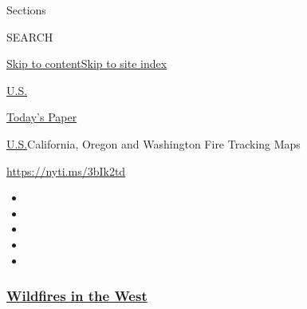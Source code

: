 Sections

SEARCH

\protect\hyperlink{site-content}{Skip to
content}\protect\hyperlink{site-index}{Skip to site index}

\href{https://www.nytimes3xbfgragh.onion/section/us}{U.S.}

\href{https://myaccount.nytimes3xbfgragh.onion/auth/login?response_type=cookie\&client_id=vi}{}

\href{https://www.nytimes3xbfgragh.onion/section/todayspaper}{Today's
Paper}

\href{/section/us}{U.S.}\textbar{}California, Oregon and Washington Fire
Tracking Maps

\url{https://nyti.ms/3bIk2td}

\begin{itemize}
\item
\item
\item
\item
\item
\end{itemize}

\hypertarget{wildfires-in-the-west}{%
\subsubsection{\texorpdfstring{\href{https://www.nytimes3xbfgragh.onion/spotlight/california-wildfires?name=styln-california-wildfires\&region=TOP_BANNER\&block=storyline_menu_recirc\&action=click\&pgtype=Interactive\&impression_id=6cd8b8d0-f52c-11ea-a92a-d1075f6219dd\&variant=undefined}{Wildfires
in the West}}{Wildfires in the West}}\label{wildfires-in-the-west}}

